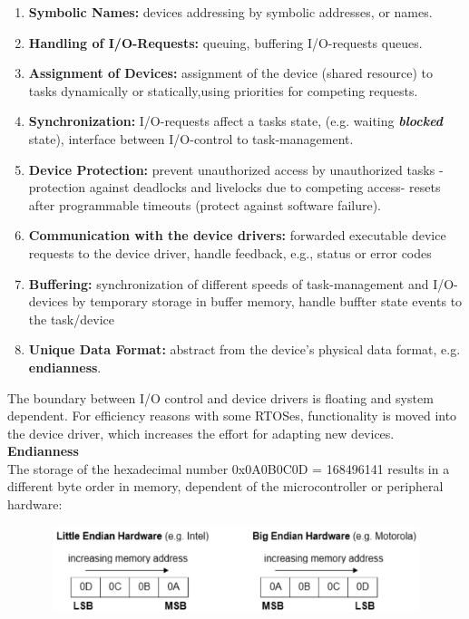 \begin{enumerate}
	\item  \textbf{Symbolic Names: }devices addressing by symbolic addresses, or names.
	\item  \textbf{Handling of I/O-Requests: }queuing, buffering I/O-requests  queues.
	\item  \textbf{Assignment of Devices: }assignment of the device (shared resource) to tasks dynamically or 	statically,using priorities for competing requests. 

	\item  \textbf{Synchronization: }I/O-requests affect a tasks state, (e.g. waiting  \textbf{\textit{blocked}} state), interface between I/O-control to task-management.

	\item  \textbf{Device Protection: } prevent unauthorized access by unauthorized tasks - protection against deadlocks and livelocks due to competing access- resets after programmable timeouts (protect against software failure).

	\item  \textbf{Communication with the device drivers: }forwarded executable device requests to the device driver, handle feedback, e.g., status or error codes 

	\item  \textbf{Buffering: }synchronization of different speeds of task-management and I/O-devices by temporary storage in buffer memory, handle buffter state events to the task/device

	\item  \textbf{Unique Data Format: }abstract from the device's physical data format, e.g. \textbf{endianness}.
\end{enumerate}

The boundary between I/O control and device drivers is floating and system dependent. For efficiency reasons with some RTOSes, functionality is moved into the device driver, which increases the effort for adapting new devices.\\

{\rot\bf Endianness}\\

The storage of the hexadecimal number 0x0A0B0C0D = 168496141 results in a different byte order in memory, dependent of the microcontroller or peripheral hardware:

 	\begin{figure}[h]
    \centering
    \includegraphics[width=13cm, height=2.5cm]{Images/image120.png}
    \label{fig:Fig 69}
    \end{figure}

